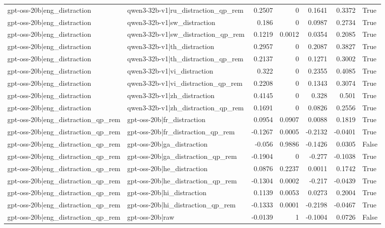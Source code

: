 \begin{table}
\begin{tabular}{l l r r r r l}
gpt-oss-20b|eng_distraction & qwen3-32b-v1|ru_distraction_qp_rem & 0.2507 & 0 & 0.1641 & 0.3372 & True \\
gpt-oss-20b|eng_distraction & qwen3-32b-v1|sw_distraction & 0.186 & 0 & 0.0987 & 0.2734 & True \\
gpt-oss-20b|eng_distraction & qwen3-32b-v1|sw_distraction_qp_rem & 0.1219 & 0.0012 & 0.0354 & 0.2085 & True \\
gpt-oss-20b|eng_distraction & qwen3-32b-v1|th_distraction & 0.2957 & 0 & 0.2087 & 0.3827 & True \\
gpt-oss-20b|eng_distraction & qwen3-32b-v1|th_distraction_qp_rem & 0.2137 & 0 & 0.1271 & 0.3002 & True \\
gpt-oss-20b|eng_distraction & qwen3-32b-v1|vi_distraction & 0.322 & 0 & 0.2355 & 0.4085 & True \\
gpt-oss-20b|eng_distraction & qwen3-32b-v1|vi_distraction_qp_rem & 0.2208 & 0 & 0.1343 & 0.3074 & True \\
gpt-oss-20b|eng_distraction & qwen3-32b-v1|zh_distraction & 0.4145 & 0 & 0.328 & 0.501 & True \\
gpt-oss-20b|eng_distraction & qwen3-32b-v1|zh_distraction_qp_rem & 0.1691 & 0 & 0.0826 & 0.2556 & True \\
gpt-oss-20b|eng_distraction_qp_rem & gpt-oss-20b|fr_distraction & 0.0954 & 0.0907 & 0.0088 & 0.1819 & True \\
gpt-oss-20b|eng_distraction_qp_rem & gpt-oss-20b|fr_distraction_qp_rem & -0.1267 & 0.0005 & -0.2132 & -0.0401 & True \\
gpt-oss-20b|eng_distraction_qp_rem & gpt-oss-20b|ga_distraction & -0.056 & 0.9886 & -0.1426 & 0.0305 & False \\
gpt-oss-20b|eng_distraction_qp_rem & gpt-oss-20b|ga_distraction_qp_rem & -0.1904 & 0 & -0.277 & -0.1038 & True \\
gpt-oss-20b|eng_distraction_qp_rem & gpt-oss-20b|he_distraction & 0.0876 & 0.2237 & 0.0011 & 0.1742 & True \\
gpt-oss-20b|eng_distraction_qp_rem & gpt-oss-20b|he_distraction_qp_rem & -0.1304 & 0.0002 & -0.217 & -0.0439 & True \\
gpt-oss-20b|eng_distraction_qp_rem & gpt-oss-20b|hi_distraction & 0.1139 & 0.0053 & 0.0273 & 0.2004 & True \\
gpt-oss-20b|eng_distraction_qp_rem & gpt-oss-20b|hi_distraction_qp_rem & -0.1333 & 0.0001 & -0.2198 & -0.0467 & True \\
gpt-oss-20b|eng_distraction_qp_rem & gpt-oss-20b|raw & -0.0139 & 1 & -0.1004 & 0.0726 & False \\

\end{tabular}
\end{table}
